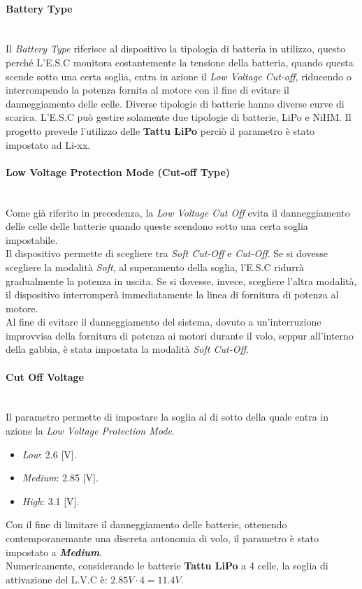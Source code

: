 \paragraph{\small{Battery Type}}\mbox{}\\
Il \textit{Battery Type} riferisce al dispositivo la tipologia di batteria in utilizzo, questo perché L'E.S.C monitora costantemente la tensione della batteria, quando questa scende sotto una certa soglia, entra in azione il \textit{Low Voltage Cut-off}, riducendo o interrompendo la potenza fornita al motore con il fine di evitare il danneggiamento delle celle.
Diverse tipologie di batterie hanno diverse curve di scarica.
L'E.S.C può gestire solamente due tipologie di batterie, LiPo e NiHM. Il progetto prevede l'utilizzo delle \textbf{Tattu LiPo} perciò il parametro è stato impostato ad Li-xx.

\paragraph{\small{Low Voltage Protection Mode (Cut-off Type)}}\mbox{}\\
Come già riferito in precedenza, la \textit{Low Voltage Cut Off} evita il danneggiamento delle celle delle batterie quando queste scendono sotto una certa soglia impostabile.\\
Il dispositivo permette di scegliere tra \textit{Soft Cut-Off} e \textit{Cut-Off}. Se si dovesse scegliere la modalità \textit{Soft}, al superamento della soglia, l'E.S.C ridurrà gradualmente la potenza in uscita. Se si dovesse, invece, scegliere l'altra modalità, il dispositivo interromperà immediatamente la linea di fornitura di potenza al motore.\\
Al fine di evitare il danneggiamento del sistema, dovuto a un'interruzione improvvisa della fornitura di potenza ai motori durante il volo, seppur all'interno della gabbia, è stata impostata la modalità \textit{Soft Cut-Off}.

\paragraph{\small{Cut Off Voltage}}\mbox{}\\
Il parametro permette di impostare la soglia al di sotto della quale entra in azione la \textit{Low Voltage Protection Mode}.
\begin{itemize}
    \item \textit{Low}: 2.6 [V].
    \item \textit{Medium}: 2.85 [V].
    \item \textit{High}: 3.1 [V].
\end{itemize}
Con il fine di limitare il danneggiamento delle batterie, ottenendo contemporanemante una discreta autonomia di volo, il parametro è stato impostato a \textit{\textbf{Medium}}.\\
Numericamente, considerando le batterie \textbf{Tattu LiPo} a 4 celle, la soglia di attivazione del L.V.C è: $2.85 V\cdot4 = 11.4 V$.


